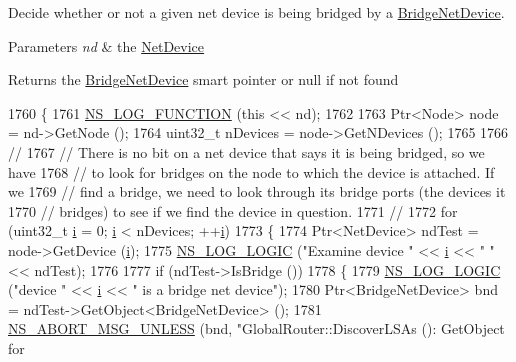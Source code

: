 Decide whether or not a given net device is being bridged by a \hyperlink{classns3_1_1BridgeNetDevice}{Bridge\+Net\+Device}. 


\begin{DoxyParams}{Parameters}
{\em nd} & the \hyperlink{classns3_1_1NetDevice}{Net\+Device} \\
\hline
\end{DoxyParams}
\begin{DoxyReturn}{Returns}
the \hyperlink{classns3_1_1BridgeNetDevice}{Bridge\+Net\+Device} smart pointer or null if not found 
\end{DoxyReturn}

\begin{DoxyCode}
1760 \{
1761   \hyperlink{log-macros-disabled_8h_a90b90d5bad1f39cb1b64923ea94c0761}{NS\_LOG\_FUNCTION} (\textcolor{keyword}{this} << nd);
1762 
1763   Ptr<Node> node = nd->GetNode ();
1764   uint32\_t nDevices = node->GetNDevices ();
1765 
1766   \textcolor{comment}{//}
1767   \textcolor{comment}{// There is no bit on a net device that says it is being bridged, so we have}
1768   \textcolor{comment}{// to look for bridges on the node to which the device is attached.  If we}
1769   \textcolor{comment}{// find a bridge, we need to look through its bridge ports (the devices it}
1770   \textcolor{comment}{// bridges) to see if we find the device in question.}
1771   \textcolor{comment}{//}
1772   \textcolor{keywordflow}{for} (uint32\_t \hyperlink{bernuolliDistribution_8m_a6f6ccfcf58b31cb6412107d9d5281426}{i} = 0; \hyperlink{bernuolliDistribution_8m_a6f6ccfcf58b31cb6412107d9d5281426}{i} < nDevices; ++\hyperlink{bernuolliDistribution_8m_a6f6ccfcf58b31cb6412107d9d5281426}{i})
1773     \{
1774       Ptr<NetDevice> ndTest = node->GetDevice (\hyperlink{bernuolliDistribution_8m_a6f6ccfcf58b31cb6412107d9d5281426}{i});
1775       \hyperlink{group__logging_ga88acd260151caf2db9c0fc84997f45ce}{NS\_LOG\_LOGIC} (\textcolor{stringliteral}{"Examine device "} << \hyperlink{bernuolliDistribution_8m_a6f6ccfcf58b31cb6412107d9d5281426}{i} << \textcolor{stringliteral}{" "} << ndTest);
1776 
1777       \textcolor{keywordflow}{if} (ndTest->IsBridge ())
1778         \{
1779           \hyperlink{group__logging_ga88acd260151caf2db9c0fc84997f45ce}{NS\_LOG\_LOGIC} (\textcolor{stringliteral}{"device "} << \hyperlink{bernuolliDistribution_8m_a6f6ccfcf58b31cb6412107d9d5281426}{i} << \textcolor{stringliteral}{" is a bridge net device"});
1780           Ptr<BridgeNetDevice> bnd = ndTest->GetObject<BridgeNetDevice> ();
1781           \hyperlink{group__fatal_ga0bd3f62c55e7347ff814572f3aaa3864}{NS\_ABORT\_MSG\_UNLESS} (bnd, \textcolor{stringliteral}{"GlobalRouter::DiscoverLSAs (): GetObject for
}
\end{DoxyCode}
